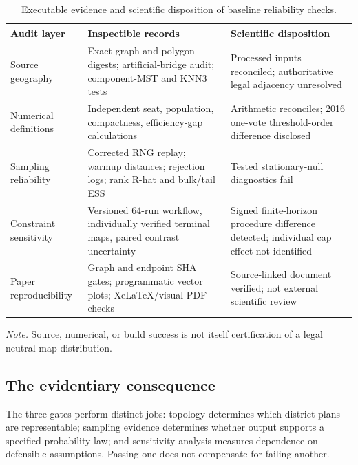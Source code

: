 \documentclass[
  10pt,
]{article}
\begin{document}
\begin{table}[H]
\centering
\caption{Executable evidence and scientific disposition of baseline reliability checks.}
\label{tab:audit-gates}
\begin{threeparttable}
\footnotesize
\begin{tabularx}{\linewidth}{@{}>{\raggedright\arraybackslash}p{.21\linewidth}
>{\raggedright\arraybackslash}p{.33\linewidth}
>{\raggedright\arraybackslash}X@{}}
\toprule
\textbf{Audit layer} & \textbf{Inspectible records} & \textbf{Scientific disposition}\\
\midrule
Source geography & Exact graph and polygon digests; artificial-bridge audit; component-MST and KNN3 tests
& Processed inputs reconciled; authoritative legal adjacency unresolved\\
Numerical definitions & Independent seat, population, compactness, efficiency-gap calculations
& Arithmetic reconciles; 2016 one-vote threshold-order difference disclosed\\
Sampling reliability & Corrected RNG replay; warmup distances; rejection logs; rank R-hat and bulk/tail ESS
& Tested stationary-null diagnostics fail\\
Constraint sensitivity & Versioned 64-run workflow, individually verified terminal maps, paired contrast uncertainty
& Signed finite-horizon procedure difference detected; individual cap effect not identified\\
Paper reproducibility & Graph and endpoint SHA gates; programmatic vector plots; XeLaTeX/visual PDF checks
& Source-linked document verified; not external scientific review\\
\bottomrule
\end{tabularx}
\begin{tablenotes}[flushleft]
\footnotesize
\item \emph{Note.} Source, numerical, or build success is not itself certification of a legal neutral-map distribution.
\end{tablenotes}
\end{threeparttable}
\end{table}

\hypertarget{the-evidentiary-consequence}{%
\subsection{The evidentiary
consequence}\label{the-evidentiary-consequence}}

The three gates perform distinct jobs: topology determines which
district plans are representable; sampling evidence determines whether
output supports a specified probability law; and sensitivity analysis
measures dependence on defensible assumptions. Passing one does not
compensate for failing another.
\end{document}

